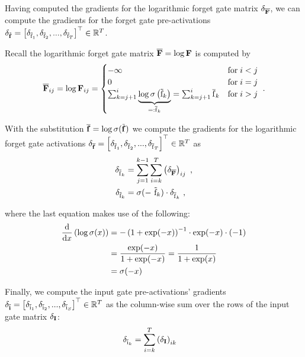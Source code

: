 \documentclass[dvipsnames]{article}
\begin{document}
\begin{appendix}
Having computed the gradients for the logarithmic forget gate matrix $\delta_{\overline{\bm{\mathrm{F}}}}$, 
we can compute the gradients for the forget gate pre-activations $\delta_{\tilde{\bm{\mathrm{f}}}} = \left[\delta_{\tilde{\mathrm{f}}_1}, \delta_{\tilde{\mathrm{f}}_2}, ..., \delta_{\tilde{\mathrm{f}}_T} \right]^\top \in \mathbb{R}^T$.

Recall the logarithmic forget gate matrix $\overline{\bm{\mathrm{F}}} = \log \bm{\mathrm{F}}$ is computed by
\begin{equation}
    \overline{\bm{\rF}}_{ij} = \log \bm{\rF}_{ij} = \begin{cases}
        -\infty                                                  & \text{for} \; i < j \\ %
        0 & \text{for} \;  i = j \\ %
        \sum_{k=j+1}^{i} \underbrace{\log \sigma\left(\tilde{\Rf}_k\right)}_{=: \overline{\Rf}_k} =  \sum_{k=j+1}^{i} \overline{\Rf}_k & \text{for} \; i > j %
    \end{cases} \ .
\end{equation}

With the substitution $\overline{\bm{\mathrm{f}}} = \log \sigma(\tilde{\bm{\mathrm{f}}})$ we compute the gradients 
for the logarithmic forget gate activations $\delta_{\overline{\bm{\mathrm{f}}}} = \left[\delta_{\overline{\mathrm{f}}_1}, \delta_{\overline{\mathrm{f}}_2}, ..., \delta_{\overline{\mathrm{f}}_T} \right]^\top \in \mathbb{R}^T$ 
as 
\begin{align}
    \delta_{\overline{\mathrm{f}}_k} &= \sum_{j=1}^{k-1} \sum_{i=k}^{T} \left(\delta_{\overline{\bm{\mathrm{F}}}}\right)_{ij} \ , \\
    \delta_{\tilde{\mathrm{f}}_k} &= \sigma(- \ \tilde{\mathrm{f}}_k) \cdot \delta_{\overline{\mathrm{f}}_k} \ ,
\end{align}

\raggedbottom

where the last equation makes use of the following:
\begin{align}
    \begin{split}
    \frac{\mathrm{d}}{\mathrm{d} x}\left(\log \sigma(x)\right) &= - \left(1 + \exp(-x)\right)^{-1} \cdot \exp(-x) \cdot (-1) \\
    &= \frac{\exp(-x)}{1+\exp(-x)} = \frac{1}{1+\exp(x)} \\
    &=\sigma(-x)
    \end{split}
\end{align}

Finally, we compute the input gate pre-activations' gradients $\delta_{\tilde{\bm{\mathrm{i}}}} = \left[\delta_{\tilde{\mathrm{i}}_1}, \delta_{\tilde{\mathrm{i}}_2}, ..., \delta_{\tilde{\mathrm{i}}_S} \right]^\top \in \mathbb{R}^T$ 
as the column-wise sum over the rows of the input gate matrix $\delta_{\bm{\mathrm{I}}}$:
\begin{align} 
    \delta_{\tilde{\mathrm{i}}_k} &= \sum_{i=k}^{T} \left(\delta_{\bm{\mathrm{I}}}\right)_{ik}
\end{align}


\end{appendix}
\end{document}
